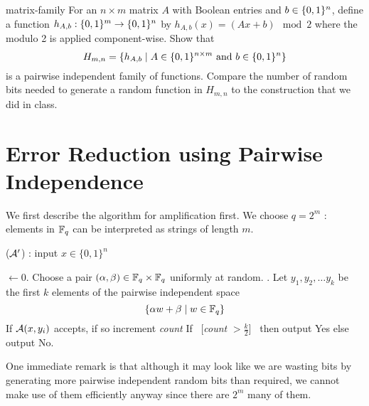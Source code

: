 \begin{exercise-prob}
\begin{show-ps2}{matrix-family}
For an $n \times m$ matrix $A$ with Boolean entries and
$b \in \{0,1\}^n$, define a function $h_{A,b} : \{0,1\}^m \to \{0,1\}^n$ by
$h_{A,b}(x)= (Ax + b) \mod 2$ where the modulo 2 is applied component-wise. Show that 
$$H_{m,n} = \{h_{A,b} \mid A \in \{0,1\}^{n \times m} \textrm{ and } b \in \{0,1\}^n\}$$
is a pairwise independent family of functions. Compare the number of random bits needed to generate a random function in $H_{m,n}$ to the construction that we did in class.
\end{show-ps2}
\end{exercise-prob}

\section{Error Reduction using Pairwise Independence}
We first describe the algorithm for amplification first. We choose $q = 2^m$ : elements in ${\mathbb{F}}_q$ can be interpreted as strings of length $m$.

\begin{algorithm}
\label{alg:pairwise-indep-amplification}
\caption{(${\cal{A}'}$) : input $x \in \{0,1\}^n$} 
\begin{algorithmic}[1]
 $\gets 0$. 
\State Choose a pair $(\alpha,\beta) \in {\mathbb{F}}_q \times {\mathbb{F}}_q$ uniformly at random. . 
\State Let $y_1, y_2, \ldots y_k$ be the first $k$ elements of the pairwise independent space 
\vspace{-3mm}
$$\{ \alpha w + \beta \mid w \in {\mathbb{F}}_q \}$$
\vspace{-10mm}
	\State If ${\cal{A}}(x,y_i)$ accepts, if so increment {\em count}
\EndFor
\State If ~[{\em count} $> \frac{k}{2}$]~ then output {\sc Yes} else output {\sc No}.
\end{algorithmic}
\end{algorithm}
One immediate remark is that although it may look like we are wasting bits by generating more pairwise independent random bits than required, we cannot make use of them efficiently anyway since there are $2^m$ many of them.

